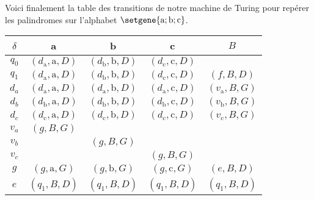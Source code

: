 Voici finalement la table des transitions de notre machine de Turing pour repérer les palindromes sur l'alphabet $\setgene{\text{a} ; \text{b} ; \text{c}}$.
\begin{center}
	\begin{tabular}{|c||c|c|c|c|}
		\hline
		$\delta$ 
			& a 
			& b 
			& c 
			& $B$ \\
		\hline
		\hline
		$q_0$
			& $(d_\text{a} , \text{a} , D)$
			& $(d_\text{b} , \text{b} , D)$
			& $(d_\text{c} , \text{c} , D)$
			& \\
		\hline
		$q_1$
			& $(d_\text{a} , \text{a} , D)$
			& $(d_\text{b} , \text{b} , D)$
			& $(d_\text{c} , \text{c} , D)$
			& $(f          , B        , D)$ \\
		\hline
		\hline
		$d_a$
			& $(d_\text{a} , \text{a} , D)$
			& $(d_\text{a} , \text{b} , D)$
			& $(d_\text{a} , \text{c} , D)$
			& $(v_\text{a} , B        , G)$ \\
		\hline
		$d_b$
			& $(d_\text{b} , \text{a} , D)$
			& $(d_\text{b} , \text{b} , D)$
			& $(d_\text{b} , \text{c} , D)$
			& $(v_\text{b} , B        , G)$ \\
		\hline
		$d_c$
			& $(d_\text{c} , \text{a} , D)$
			& $(d_\text{c} , \text{b} , D)$
			& $(d_\text{c} , \text{c} , D)$
			& $(v_\text{c} , B        , G)$ \\
		\hline
		\hline
		$v_a$
			& $(g , B , G)$
			& 
			& 
			&  \\
		\hline
		$v_b$
			& 
			& $(g , B , G)$
			& 
			&  \\
		\hline
		$v_c$
			& 
			& 
			& $(g , B , G)$
			&  \\
		\hline
		\hline
		$g$
			& $(g , \text{a} , G)$
			& $(g , \text{b} , G)$
			& $(g , \text{c} , G)$
			& $(e , B        , D)$ \\
		\hline
		$e$
			& $(q_1 , B , D)$
			& $(q_1 , B , D)$
			& $(q_1 , B , D)$
			& $(q_1 , B , D)$ \\
		\hline
	\end{tabular}
\end{center}


